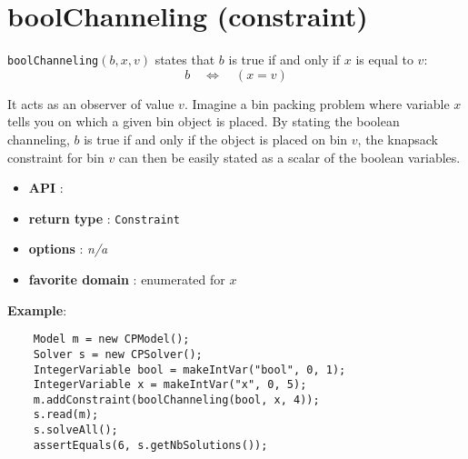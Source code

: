 \label{boolchanneling}
\hypertarget{boolchanneling}{}

\section{boolChanneling (constraint)}\label{boolchanneling:boolchannelingconstraint}\hypertarget{boolchanneling:boolchannelingconstraint}{}
\begin{notedef}  
\texttt{boolChanneling}$(b,x,v)$ states that $b$ is true if and only if $x$ is equal to $v$:
$$b\quad\iff\quad (x=v)$$ 
\end{notedef}

It acts as an observer of value $v$. Imagine a bin packing problem where variable $x$ tells you on which a given bin object is placed. By stating the boolean channeling, $b$ is true if and only if the object is placed on bin $v$, the knapsack constraint for bin $v$ can then be easily stated as a scalar of the boolean variables.
\begin{itemize}
	\item \textbf{API} : 
	\item \textbf{return type} : \texttt{Constraint}
	\item \textbf{options} : \emph{n/a}
	\item \textbf{favorite domain} : enumerated for $x$
\end{itemize}

\textbf{Example}:
\begin{lstlisting}
	Model m = new CPModel();
	Solver s = new CPSolver();
	IntegerVariable bool = makeIntVar("bool", 0, 1);
	IntegerVariable x = makeIntVar("x", 0, 5);
	m.addConstraint(boolChanneling(bool, x, 4));
	s.read(m);
	s.solveAll();
	assertEquals(6, s.getNbSolutions());
\end{lstlisting}
